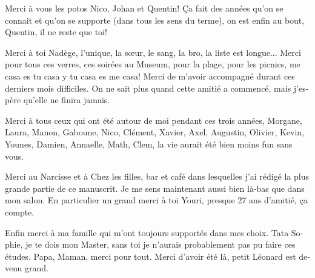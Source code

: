 \documentclass[../main.tex]{subfiles}
\begin{document}
\begin{otherlanguage}{french}
Merci à vous les potos Nico, Johan et Quentin! Ça fait des années qu'on se connait et qu'on se supporte (dans tous les sens du terme), on est enfin au bout, Quentin, il ne reste que toi!

Merci à toi Nadège, l'unique, la s\oe{}ur, le sang, la bro, la liste est longue... Merci pour tous ces verres, ces soirées au Museum, pour la plage, pour les picnics, me casa es tu casa y tu casa es me casa! Merci de m'avoir accompagné durant ces derniers mois difficiles. On ne sait plus quand cette amitié a commencé, mais j'espère qu'elle ne finira jamais.

Merci à tous ceux qui ont été autour de moi pendant ces trois années, Morgane, Laura, Manon, Gaboune, Nico, Clément, Xavier, Axel, Augustin, Olivier, Kevin, Younes, Damien, Annaelle, Math, Clem, la vie aurait été bien moins fun sans vous.

Merci au Narcisse et à Chez les filles, bar et café dans lesquelles j'ai rédigé la plus grande partie de ce manuscrit. Je me sens maintenant aussi bien là-bas que dans mon salon. En particulier un grand merci à toi Youri, presque 27 ans d'amitié, ça compte.

Enfin merci à ma famille qui m'ont toujours supportés dans mes choix. Tata Sophie, je te dois mon Master, sans toi je n'aurais probablement pas pu faire ces études. Papa, Maman, merci pour tout. Merci d'avoir été là, petit Léonard est devenu grand.



\end{otherlanguage}
\end{document}
